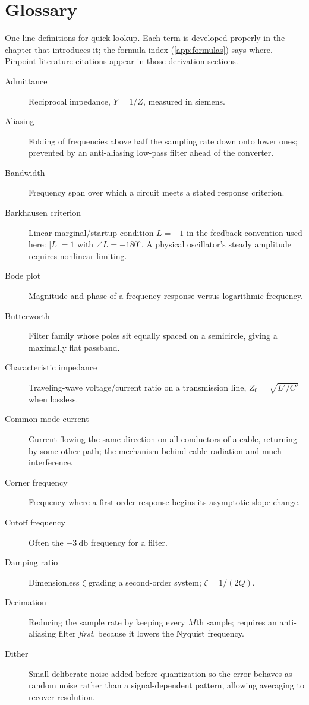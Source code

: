 \chapter{Glossary}
\label{app:glossary}
One-line definitions for quick lookup. Each term is developed properly in the chapter
that introduces it; the formula index (\cref{app:formulas}) says where. Pinpoint
literature citations appear in those derivation sections.

\begin{description}
\item[Admittance] Reciprocal impedance, \(Y=1/Z\), measured in siemens.
\item[Aliasing] Folding of frequencies above half the sampling rate down onto lower ones; prevented by an anti-aliasing low-pass filter ahead of the converter.
\item[Bandwidth] Frequency span over which a circuit meets a stated response criterion.
\item[Barkhausen criterion] Linear marginal/startup condition \(L=-1\) in the feedback convention used here: \(|L|=1\) with \(\angle L=-180^\circ\). A physical oscillator's steady amplitude requires nonlinear limiting.
\item[Bode plot] Magnitude and phase of a frequency response versus logarithmic frequency.
\item[Butterworth] Filter family whose poles sit equally spaced on a semicircle, giving a maximally flat passband.
\item[Characteristic impedance] Traveling-wave voltage/current ratio on a transmission line, \(Z_0=\sqrt{L'/C'}\) when lossless.
\item[Common-mode current] Current flowing the same direction on all conductors of a cable, returning by some other path; the mechanism behind cable radiation and much interference.
\item[Corner frequency] Frequency where a first-order response begins its asymptotic slope change.
\item[Cutoff frequency] Often the \(-\SI{3}{\decibel}\) frequency for a filter.
\item[Damping ratio] Dimensionless \(\zeta\) grading a second-order system; \(\zeta=1/(2Q)\).
\item[Decimation] Reducing the sample rate by keeping every \(M\)th sample; requires an anti-aliasing filter \emph{first}, because it lowers the Nyquist frequency.
\item[Dither] Small deliberate noise added before quantization so the error behaves as random noise rather than a signal-dependent pattern, allowing averaging to recover resolution.

\end{description}
